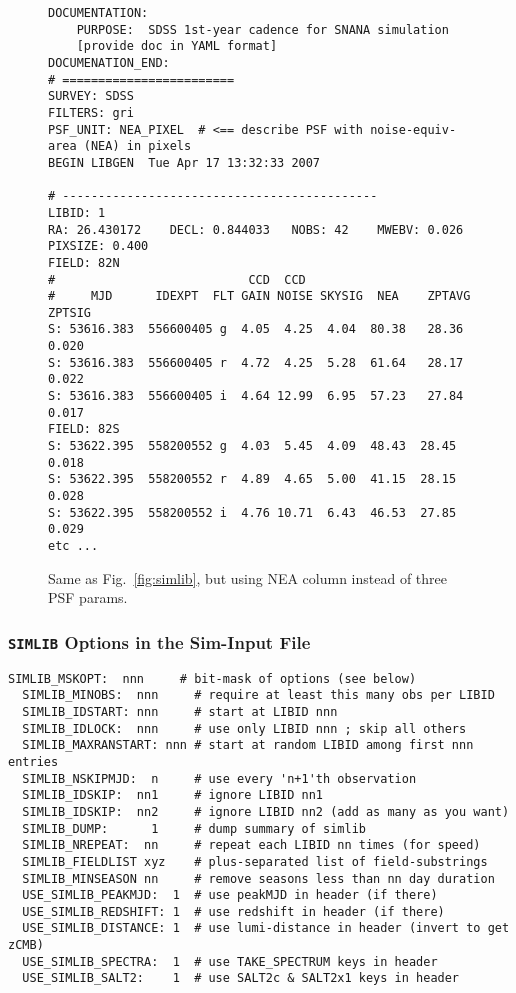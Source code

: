 \documentclass[12pt]{article}
\newcommand{\simlib}{{\tt SIMLIB}}
\begin{document}
{\begin{figure} [ht] 
\begin{center}
\begin{Verbatim}[frame=single]
DOCUMENTATION:
    PURPOSE:  SDSS 1st-year cadence for SNANA simulation
    [provide doc in YAML format]
DOCUMENATION_END:
# ========================
SURVEY: SDSS     
FILTERS: gri 
PSF_UNIT: NEA_PIXEL  # <== describe PSF with noise-equiv-area (NEA) in pixels
BEGIN LIBGEN  Tue Apr 17 13:32:33 2007
 
# -------------------------------------------- 
LIBID: 1 
RA: 26.430172    DECL: 0.844033   NOBS: 42    MWEBV: 0.026   PIXSIZE: 0.400 
FIELD: 82N
#                           CCD  CCD        
#     MJD      IDEXPT  FLT GAIN NOISE SKYSIG  NEA    ZPTAVG ZPTSIG
S: 53616.383  556600405 g  4.05  4.25  4.04  80.38   28.36  0.020 
S: 53616.383  556600405 r  4.72  4.25  5.28  61.64   28.17  0.022 
S: 53616.383  556600405 i  4.64 12.99  6.95  57.23   27.84  0.017 
FIELD: 82S
S: 53622.395  558200552 g  4.03  5.45  4.09  48.43  28.45  0.018 
S: 53622.395  558200552 r  4.89  4.65  5.00  41.15  28.15  0.028 
S: 53622.395  558200552 i  4.76 10.71  6.43  46.53  27.85  0.029 
etc ...
\end{Verbatim}
\end{center}
\caption{
  Same as Fig.~\ref{fig:simlib}, but using NEA column instead of
  three PSF params.
 }
\label{fig:simlib_nea}
\end{figure}



\clearpage
\subsubsection{{\simlib} Options in the Sim-Input File}
\label{sssec:simlib_options}

\begin{Verbatim}[frame=single]
  SIMLIB_MSKOPT:  nnn     # bit-mask of options (see below)
  SIMLIB_MINOBS:  nnn     # require at least this many obs per LIBID
  SIMLIB_IDSTART: nnn     # start at LIBID nnn
  SIMLIB_IDLOCK:  nnn     # use only LIBID nnn ; skip all others
  SIMLIB_MAXRANSTART: nnn # start at random LIBID among first nnn entries
  SIMLIB_NSKIPMJD:  n     # use every 'n+1'th observation
  SIMLIB_IDSKIP:  nn1     # ignore LIBID nn1
  SIMLIB_IDSKIP:  nn2     # ignore LIBID nn2 (add as many as you want)  
  SIMLIB_DUMP:      1     # dump summary of simlib 
  SIMLIB_NREPEAT:  nn     # repeat each LIBID nn times (for speed)
  SIMLIB_FIELDLIST xyz    # plus-separated list of field-substrings
  SIMLIB_MINSEASON nn     # remove seasons less than nn day duration
  USE_SIMLIB_PEAKMJD:  1  # use peakMJD in header (if there)
  USE_SIMLIB_REDSHIFT: 1  # use redshift in header (if there)
  USE_SIMLIB_DISTANCE: 1  # use lumi-distance in header (invert to get zCMB)
  USE_SIMLIB_SPECTRA:  1  # use TAKE_SPECTRUM keys in header 
  USE_SIMLIB_SALT2:    1  # use SALT2c & SALT2x1 keys in header


\end{Verbatim}}
\end{document}
